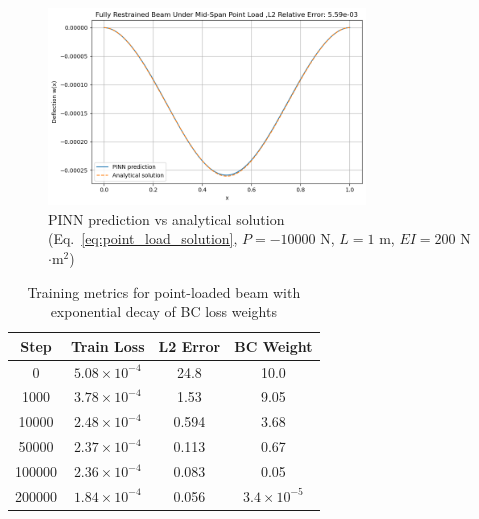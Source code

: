 \documentclass[12pt]{article}
\begin{document}
\begin{figure}[htbp]
	\centering
	\includegraphics[width=0.75\textwidth]{mid_span_restrained_results.png}
	\caption{PINN prediction vs analytical solution (Eq.~\ref{eq:point_load_solution}, $P=-10000$ N, $L=1$ m, $EI=200$ N$\cdot$m$^2$)}
	\label{fig:midspan_restrained}
\end{figure}

\begin{table}[htbp]
	\centering
	\begin{tabular}{c c c c}
		\toprule
		\textbf{Step} & \textbf{Train Loss} & \textbf{L2 Error} & \textbf{BC Weight} \\
		\midrule
		0 & $5.08 \times 10^{-4}$ & 24.8 & 10.0 \\
		1000 & $3.78 \times 10^{-4}$ & 1.53 & 9.05 \\
		10000 & $2.48 \times 10^{-4}$ & 0.594 & 3.68 \\
		50000 & $2.37 \times 10^{-4}$ & 0.113 & 0.67 \\
		100000 & $2.36 \times 10^{-4}$ & 0.083 & 0.05 \\
		200000 & $1.84 \times 10^{-4}$ & 0.056 & $3.4 \times 10^{-5}$ \\
		\bottomrule
	\end{tabular}
	\caption{Training metrics for point-loaded beam with exponential decay of BC loss weights}
\end{table}
\end{document}
